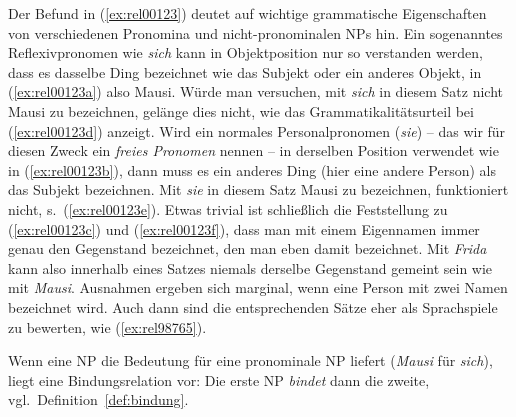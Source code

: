 \begin{exe}
  \ex\label{ex:rel00123} 
  \begin{xlist}
  \end{xlist}
\end{exe}

Der Befund in (\ref{ex:rel00123}) deutet auf wichtige grammatische Eigenschaften von verschiedenen Pronomina und nicht-pronominalen NPs hin.
Ein sogenanntes Reflexivpronomen wie \textit{sich} kann in Objektposition nur so verstanden werden, dass es dasselbe Ding bezeichnet wie das Subjekt oder ein anderes Objekt, in (\ref{ex:rel00123a}) also Mausi.
Würde man versuchen, mit \textit{sich} in diesem Satz nicht Mausi zu bezeichnen, gelänge dies nicht, wie das Grammatikalitätsurteil bei (\ref{ex:rel00123d}) anzeigt.
Wird ein normales Personalpronomen (\textit{sie}) -- das wir für diesen Zweck ein \textit{freies Pronomen} nennen -- in derselben Position verwendet wie in (\ref{ex:rel00123b}), dann muss es ein anderes Ding (hier eine andere Person) als das Subjekt bezeichnen.
Mit \textit{sie} in diesem Satz Mausi zu bezeichnen, funktioniert nicht, s.\ (\ref{ex:rel00123e}).
Etwas trivial ist schließlich die Feststellung zu (\ref{ex:rel00123c}) und (\ref{ex:rel00123f}), dass man \zB mit einem Eigennamen immer genau den Gegenstand bezeichnet, den man eben damit bezeichnet. 
Mit \textit{Frida} kann also innerhalb eines Satzes niemals derselbe Gegenstand gemeint sein wie mit \textit{Mausi}.
Ausnahmen ergeben sich marginal, wenn eine Person mit zwei Namen bezeichnet wird.
Auch dann sind die entsprechenden Sätze eher als Sprachspiele zu bewerten, wie \zB (\ref{ex:rel98765}).

\begin{exe}
\end{exe}

Wenn eine NP die Bedeutung für eine pronominale NP liefert (\zB \textit{Mausi} für \textit{sich}), liegt eine Bindungsrelation vor:
Die erste NP \textit{bindet} dann die zweite, vgl.\ Definition~\ref{def:bindung}.

\Np


